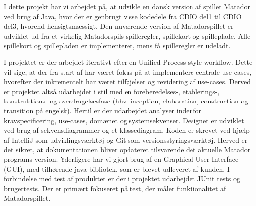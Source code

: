 \begin{flushleft} %
\doublespacing

I dette projekt har vi arbejdet på, at udvikle en dansk version af spillet Matador ved brug af Java, hvor der er genbrugt visse kodedele fra CDIO del1 til CDIO del3, hvorend hensigtsmæssigt. Den nuværende version af Matadorspillet er udviklet ud fra et virkelig Matadorspils spilleregler, spillekort og spilleplade. Alle spillekort og spillepladen er implementeret, mens få spilleregler er udeladt.

\addlinespace

I projektet er der arbejdet iterativt efter en Unified Process style workflow. Dette vil sige, at der fra start af har været fokus på at implementere centrale use-cases, hvorefter der inkrementelt har været tilføjelser og revidering af use-cases. Derved er projektet altså udarbejdet i stil med en foreberedelses-, etablerings-, konstruktions- og overdragelsesfase (hhv. inception, elaboration, construction og transition på engelsk). Hertil er der udarbejdet analyser indenfor kravspecificering, use-cases, domænet og systemsekvenser. Designet er udviklet ved brug af sekvensdiagrammer og et klassediagram.
\addlinespace
Koden er skrevet ved hjælp af IntelliJ som udviklingsværktøj og Git som versionsstyringsværktøj. Herved er det sikret, at dokumentationen bliver opdateret tilsvarende det aktuelle Matador programs version. Yderligere har vi gjort brug af en Graphical User Interface (GUI), med tilhørende java bibliotek, som er blevet udleveret af kunden.
\addlinespace
I forbindelse med test af produktet er der i projektet udarbejdet JUnit tests og brugertests. Der er primært fokuseret på test, der måler funktionalitet af Matadorspillet.
\end{flushleft}